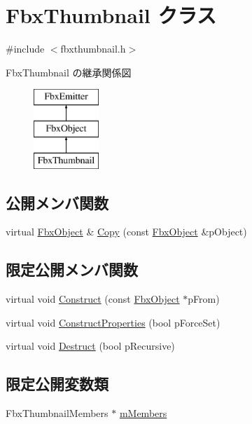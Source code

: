 \hypertarget{class_fbx_thumbnail}{}\section{Fbx\+Thumbnail クラス}
\label{class_fbx_thumbnail}


{\ttfamily \#include $<$fbxthumbnail.\+h$>$}

Fbx\+Thumbnail の継承関係図\begin{figure}[H]
\begin{center}
\leavevmode
\includegraphics[height=3.000000cm]{class_fbx_thumbnail}
\end{center}
\end{figure}
\subsection*{公開メンバ関数}
\begin{DoxyCompactItemize}
\item 
virtual \hyperlink{class_fbx_object}{Fbx\+Object} \& \hyperlink{class_fbx_thumbnail_a6321469006b5ec3769f618ab2d1444d6}{Copy} (const \hyperlink{class_fbx_object}{Fbx\+Object} \&p\+Object)
\end{DoxyCompactItemize}
\subsection*{限定公開メンバ関数}
\begin{DoxyCompactItemize}
\item 
virtual void \hyperlink{class_fbx_thumbnail_a92347df06d7c26976ed47a9650b691f7}{Construct} (const \hyperlink{class_fbx_object}{Fbx\+Object} $\ast$p\+From)
\item 
virtual void \hyperlink{class_fbx_thumbnail_ac846023b70cdbab67f477109752bfb0d}{Construct\+Properties} (bool p\+Force\+Set)
\item 
virtual void \hyperlink{class_fbx_thumbnail_a3dc89129014f8264fe8e8eb0c6eec711}{Destruct} (bool p\+Recursive)
\end{DoxyCompactItemize}
\subsection*{限定公開変数類}
\begin{DoxyCompactItemize}
\item 
Fbx\+Thumbnail\+Members $\ast$ \hyperlink{class_fbx_thumbnail_afde37b4e171f395489d254b61f42a6cd}{m\+Members}
\end{DoxyCompactItemize}
